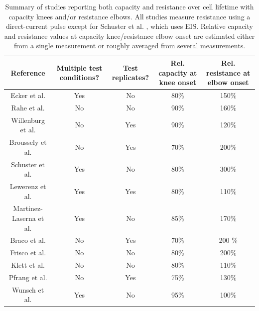 \documentclass[journal=jpcl, manuscript=article, layout=onecolumn]{achemso}
\begin{document}
\begin{landscape}

\begin{table}[!ht]
    \centering
    \begin{tabular}{||c||c|c|c|c||}
        \hline
        Reference & Multiple test conditions? & Test replicates? & Rel. capacity at knee onset & Rel. resistance at elbow onset \\
        \hline
        Ecker et al.\cite{ecker_calendar_2014} & Yes & No & 80\% & 150\% \\
        Rahe et al.\cite{rahe_nanoscale_2019} & No & No & 90\% & 160\% \\
        Willenburg et al.\cite{willenberg_development_2020} & No & Yes & 90\% & 120\% \\
        Broussely et al.\cite{broussely_main_2005} & No & Yes & 70\% & 200\% \\
        Schuster et al.\cite{schuster_nonlinear_2015} & Yes & No & 80\% & 300\% \\
        Lewerenz et al.\cite{lewerenz_systematic_2017, lewerenz_post-mortem_2017} & Yes & Yes & 80\% & 110\% \\
        Martinez-Laserna et al.\cite{martinez-laserna_technical_2018} & Yes & No &  85\% & 170\% \\
        Braco et al.\cite{braco_experimental_2020} & No & Yes & 70\% & 200 \% \\
        Frisco et al.\cite{frisco_understanding_2016} & No & No & 80\% & 200\% \\
        Klett et al.\cite{klett_non-uniform_2014} & No & No & 80\% & 110\% \\
        Pfrang et al.\cite{pfrang_long-term_2018} & No & Yes & 75\% & 130\% \\
        Wunsch et al.\cite{wunsch_investigation_2019} & Yes & No & 95\% & 100\% \\
        \hline
    \end{tabular}
    \caption{Summary of studies reporting both capacity and resistance over cell lifetime with capacity knees and/or resistance elbows. All studies measure resistance using a direct-current pulse except for Schuster et al. \cite{schuster_nonlinear_2015}, which uses EIS. Relative capacity and resistance values at capacity knee/resistance elbow onset are estimated either from a single measurement or roughly averaged from several measurements.}
    \label{tab:dcr_growth_papers}
\end{table}

\end{landscape}
\restoregeometry
\end{document}
